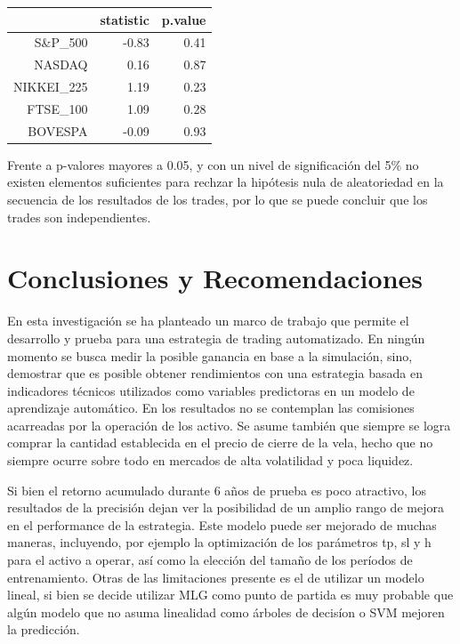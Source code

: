 \documentclass[a4paper,12pt]{Latex/Classes/PhDthesisPSnPDF}
\begin{document}
 
\begin{center}
\begin{table}[ht]
\centering
\begin{tabular}{rrr}
  \hline
 & statistic & p.value \\ 
  \hline
S\&P\_500 & -0.83 & 0.41 \\ 
  NASDAQ & 0.16 & 0.87 \\ 
  NIKKEI\_225 & 1.19 & 0.23 \\ 
  FTSE\_100 & 1.09 & 0.28 \\ 
  BOVESPA & -0.09 & 0.93 \\ 
   \hline
\end{tabular}
\end{table}\end{center}

Frente a p-valores mayores a 0.05, y con un nivel de significación del 5\% no existen elementos suficientes para rechzar la hipótesis nula de aleatoriedad en la secuencia de los resultados de los trades, por lo que se puede concluir que los trades son independientes.
  

\chapter*{Conclusiones y Recomendaciones}

En esta investigación se ha planteado un marco de trabajo que permite el desarrollo y prueba para una estrategia de trading automatizado. En ningún momento se busca medir la posible ganancia en base a la simulación, sino, demostrar que es posible obtener rendimientos con una estrategia basada en indicadores técnicos utilizados como variables predictoras en un modelo de aprendizaje automático. En los resultados no se contemplan las comisiones acarreadas por la operación de los activo. Se asume también que siempre se logra comprar la cantidad establecida en el precio de cierre de la vela, hecho que no siempre ocurre sobre todo en mercados de alta volatilidad y poca liquidez.

Si bien el retorno acumulado durante 6 años de prueba es poco atractivo, los resultados de la precisión dejan ver la posibilidad de un amplio rango de mejora en el performance de la estrategia. Este modelo puede ser mejorado de muchas maneras, incluyendo, por ejemplo la optimización de los parámetros tp, sl y h para el activo a operar, así como la elección del tamaño de los períodos de entrenamiento. Otras de las limitaciones presente es el de utilizar un modelo lineal, si bien se decide utilizar MLG como punto de partida es muy probable que algún modelo que no asuma linealidad como árboles de decisíon o SVM mejoren la predicción. 
\end{document}
